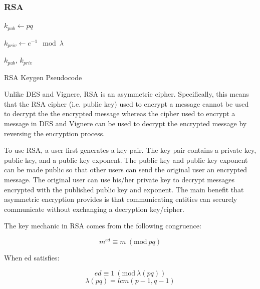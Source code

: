 \documentclass[acmlarge]{acmart}
\newcommand{\Mod}[1]{\ (\mathrm{mod}\ #1)}
\begin{document}
\subsubsection{RSA}\label{sec:rsa}
\begin{algorithm}[tbh]
\label{rsa_algo}
\SetAlgoNoLine
{}


$k_{pub} \longleftarrow pq$

$k_{priv} \longleftarrow e^{-1} \mod{\lambda}$

\KwRet $k_{pub}$, $k_{priv}$
\caption{RSA Keygen Pseudocode \cite{RSA}}
\label{alg:rsa-keygen}
\end{algorithm}

Unlike DES and Vignere, RSA is an asymmetric cipher. Specifically, this means that the RSA cipher (i.e. public key) used to encrypt a message cannot be used to decrypt the the encrypted message whereas the cipher used to encrypt a message in DES and Vignere can be used to decrypt the encrypted message by reversing the encryption process.
		
To use RSA, a user first generates a key pair. The key pair contains a private key, public key, and a public key exponent. The public key and public key exponent can be made public so that other users can send the original user an encrypted message. The original user can use his/her private key to decrypt messages encrypted with the published public key and exponent. The main benefit that asymmetric encryption provides is that communicating entities can securely communicate without exchanging a decryption key/cipher.

The key mechanic in RSA comes from the following congruence:

\begin{equation}
\label{rsa_mechanic}
	m^{ed} \equiv m \Mod{pq}
\end{equation}

When ed satisfies:

\begin{equation}
\label{ed_equiv}
	ed \equiv 1 \Mod{\lambda(pq)}
\end{equation}
\begin{equation}
\label{carmichael}
	\lambda(pq) = lcm(p - 1, q - 1)
\end{equation}
\end{document}
